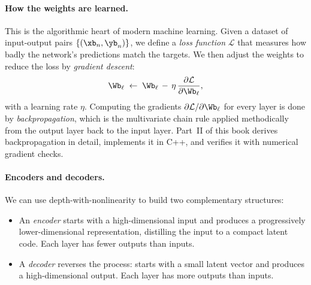 
\paragraph{How the weights are learned.}  This is the algorithmic heart
of modern machine learning.  Given a dataset of input-output pairs
$\{(\xb_n, \yb_n)\}$, we define a \emph{loss function} $\mathcal{L}$
that measures how badly the network's predictions match the targets.
We then adjust the weights to reduce the loss by \emph{gradient
descent}:
\begin{equation}
    \Wb_\ell \;\leftarrow\; \Wb_\ell \,-\, \eta\,
    \frac{\partial \mathcal{L}}{\partial \Wb_\ell},
\end{equation}
with a learning rate $\eta$.  Computing the gradients
$\partial \mathcal{L} / \partial \Wb_\ell$ for every layer is done by
\emph{backpropagation}, which is the multivariate chain rule applied
methodically from the output layer back to the input layer.  Part~II
of this book derives backpropagation in detail, implements it in C++,
and verifies it with numerical gradient checks.

\paragraph{Encoders and decoders.}  We can use depth-with-nonlinearity
to build two complementary structures:

\begin{itemize}
    \item An \emph{encoder} starts with a high-dimensional input and
    produces a progressively lower-dimensional representation,
    distilling the input to a compact latent code.  Each layer has
    fewer outputs than inputs.
    \item A \emph{decoder} reverses the process: starts with a small
    latent vector and produces a high-dimensional output.  Each layer
    has more outputs than inputs.
\end{itemize}

